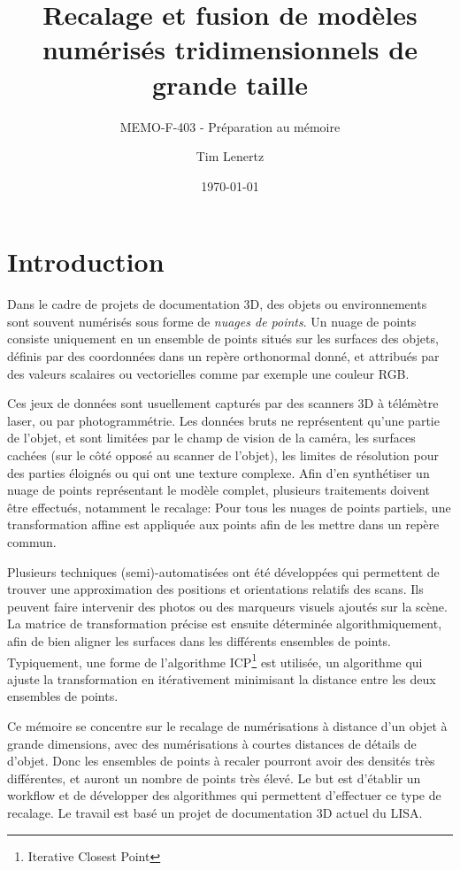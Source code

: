 \documentclass[a4paper,10pt]{scrreprt}
\begin{document}
\title{Recalage et fusion de modèles numérisés tridimensionnels de grande taille}
\subtitle{MEMO-F-403 - Préparation au mémoire}
\author{Tim Lenertz}
\date{\today}
\maketitle

\tableofcontents

\chapter{Introduction}
Dans le cadre de projets de documentation 3D, des objets ou environnements sont souvent numérisés sous forme de \emph{nuages de points}. Un nuage de points consiste uniquement en un ensemble de points situés sur les surfaces des objets, définis par des coordonnées dans un repère orthonormal donné, et attribués par des valeurs scalaires ou vectorielles comme par exemple une couleur RGB.

Ces jeux de données sont usuellement capturés par des scanners 3D à télémètre laser, ou par photogrammétrie. Les données bruts ne représentent qu'une partie de l'objet, et sont limitées par le champ de vision de la caméra, les surfaces cachées (sur le côté opposé au scanner de l'objet), les limites de résolution pour des parties éloignés ou qui ont une texture complexe. Afin d'en synthétiser un nuage de points représentant le modèle complet, plusieurs traitements doivent être effectués, notamment le recalage: Pour tous les nuages de points partiels, une transformation affine est appliquée aux points afin de les mettre dans un repère commun.

Plusieurs techniques (semi)-automatisées ont été développées qui permettent de trouver une approximation des positions et orientations relatifs des scans. Ils peuvent faire intervenir des photos ou des marqueurs visuels ajoutés sur la scène. La matrice de transformation précise est ensuite déterminée algorithmiquement, afin de bien aligner les surfaces dans les différents ensembles de points. Typiquement, une forme de l'algorithme ICP\footnote{Iterative Closest Point} est utilisée, un algorithme qui ajuste la transformation en itérativement minimisant la distance entre les deux ensembles de points.

Ce mémoire se concentre sur le recalage de numérisations à distance d'un objet à grande dimensions, avec des numérisations à courtes distances de détails de d'objet. Donc les ensembles de points à recaler pourront avoir des densités très différentes, et auront un nombre de points très élevé. Le but est d'établir un workflow et de développer des algorithmes qui permettent d'effectuer ce type de recalage. Le travail est basé un projet de documentation 3D actuel du LISA. 
\end{document}
